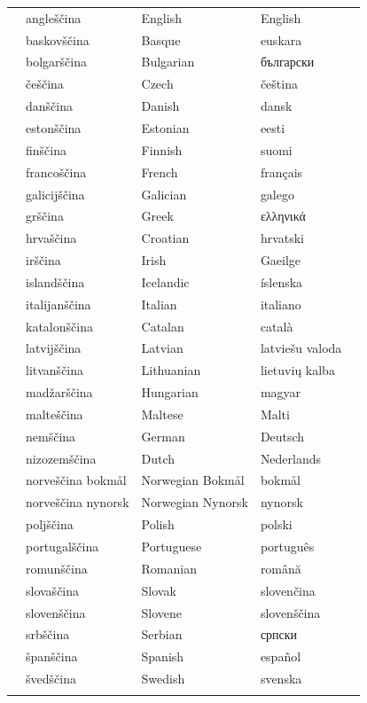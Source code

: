 \cleardoublepage

{}
\label{whitepaperseries}

\vspace*{-5mm}
\centering
  \setlength{\tabcolsep}{2em}
  \begin{tabularx}{\textwidth}{lllll} \toprule\addlinespace
  &angleščina & English & English& \\
  &baskovščina & Basque & euskara& \\
  &bolgarščina & Bulgarian & български& \\
  &češčina & Czech & čeština& \\
  &danščina & Danish & dansk& \\
  &estonščina & Estonian & eesti& \\
  &finščina & Finnish & suomi& \\
  &francoščina & French & français& \\
  &galicijščina & Galician & galego& \\
  &grščina & Greek & ελληνικά& \\
  &hrvaščina & Croatian & hrvatski& \\
  &irščina & Irish & Gaeilge& \\
  &islandščina & Icelandic & íslenska& \\
  &italijanščina & Italian & italiano& \\
  &katalonščina & Catalan & català& \\
  &latvijščina & Latvian & latviešu valoda& \\
  &litvanščina & Lithuanian & lietuvių kalba& \\
  &madžarščina & Hungarian & magyar& \\
  &malteščina & Maltese & Malti& \\
  &nemščina & German & Deutsch& \\
  &nizozemščina & Dutch & Nederlands& \\
  &norveščina bokmål & Norwegian Bokmål & bokmål& \\
  &norveščina nynorsk & Norwegian Nynorsk & nynorsk& \\
  &poljščina & Polish & polski& \\
  &portugalščina & Portuguese & português& \\
  &romunščina & Romanian & română& \\
  &slovaščina & Slovak & slovenčina& \\
  &slovenščina & Slovene & slovenščina& \\
  &srbščina & Serbian & српски& \\
  &španščina & Spanish & español& \\
  &švedščina & Swedish & svenska& \\ \addlinespace \bottomrule
\end{tabularx}
